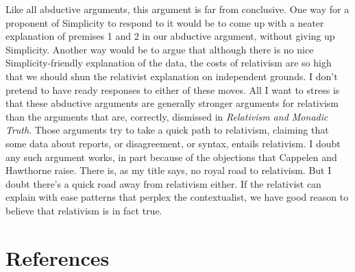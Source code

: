 \documentclass[
  10pt,
  letterpaper,
  DIV=11,
  numbers=noendperiod,
  twoside]{scrartcl}
\begin{document}
Like all abductive arguments, this argument is far from conclusive. One
way for a proponent of Simplicity to respond to it would be to come up
with a neater explanation of premises 1 and 2 in our abductive argument,
without giving up Simplicity. Another way would be to argue that
although there is no nice Simplicity-friendly explanation of the data,
the costs of relativism are so high that we should shun the relativist
explanation on independent grounds. I don't pretend to have ready
responses to either of these moves. All I want to stress is that these
abductive arguments are generally stronger arguments for relativism than
the arguments that are, correctly, dismissed in \emph{Relativism and
Monadic Truth}. Those arguments try to take a quick path to relativism,
claiming that some data about reports, or disagreement, or syntax,
entails relativism. I doubt any such argument works, in part because of
the objections that Cappelen and Hawthorne raise. There is, as my title
says, no royal road to relativism. But I doubt there's a quick road away
from relativism either. If the relativist can explain with ease patterns
that perplex the contextualist, we have good reason to believe that
relativism is in fact true.

\section*{References}\label{references}
\end{document}
